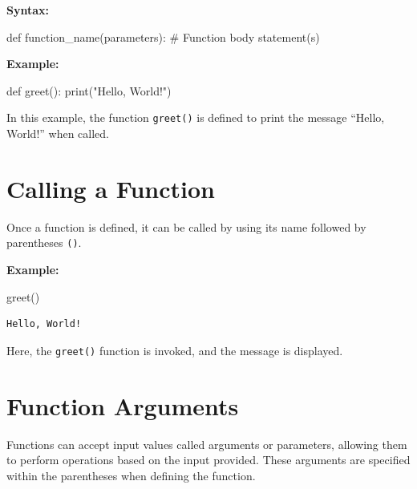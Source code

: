 \documentclass[
  letterpaper,
  DIV=11,
  numbers=noendperiod]{scrreprt}
\newenvironment{Shaded}{\begin{snugshade}}{\end{snugshade}}
\newcommand{\BuiltInTok}[1]{\textcolor[rgb]{0.00,0.23,0.31}{#1}}
\newcommand{\CommentTok}[1]{\textcolor[rgb]{0.37,0.37,0.37}{#1}}
\newcommand{\KeywordTok}[1]{\textcolor[rgb]{0.00,0.23,0.31}{#1}}
\newcommand{\NormalTok}[1]{\textcolor[rgb]{0.00,0.23,0.31}{#1}}
\newcommand{\StringTok}[1]{\textcolor[rgb]{0.13,0.47,0.30}{#1}}
\begin{document}
\textbf{Syntax:}

\begin{Shaded}
\begin{Highlighting}[]
\KeywordTok{def}\NormalTok{ function\_name(parameters):}
    \CommentTok{\# Function body}
\NormalTok{    statement(s)}
\end{Highlighting}
\end{Shaded}

\textbf{Example:}

\begin{Shaded}
\begin{Highlighting}[]
\KeywordTok{def}\NormalTok{ greet():}
    \BuiltInTok{print}\NormalTok{(}\StringTok{"Hello, World!"}\NormalTok{)}
\end{Highlighting}
\end{Shaded}

In this example, the function \texttt{greet()} is defined to print the
message ``Hello, World!'' when called.

\hypertarget{calling-a-function}{%
\section{Calling a Function}\label{calling-a-function}}

Once a function is defined, it can be called by using its name followed
by parentheses \texttt{()}.

\textbf{Example:}

\begin{Shaded}
\begin{Highlighting}[]
\NormalTok{greet() }
\end{Highlighting}
\end{Shaded}

\begin{verbatim}
Hello, World!
\end{verbatim}

Here, the \texttt{greet()} function is invoked, and the message is
displayed.

\hypertarget{function-arguments}{%
\section{Function Arguments}\label{function-arguments}}

Functions can accept input values called arguments or parameters,
allowing them to perform operations based on the input provided. These
arguments are specified within the parentheses when defining the
function.
\end{document}
